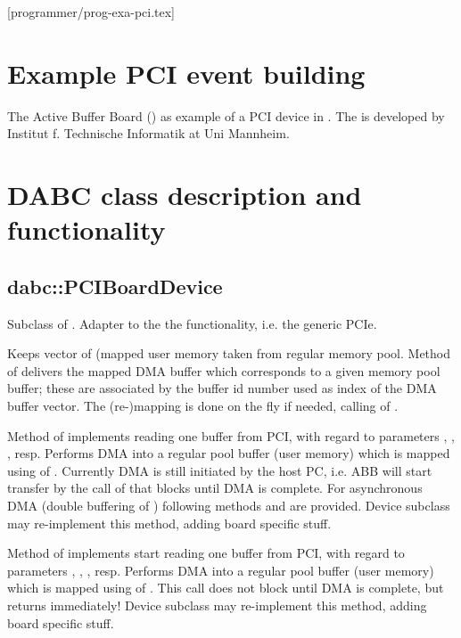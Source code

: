 [programmer/prog-exa-pci.tex]
\section{Example PCI event building}
The Active Buffer Board (\ABB) as example of a PCI device in \dabc.
The \ABB is developed by Institut f. Technische Informatik at Uni Mannheim.

\section{DABC class description and functionality}

\subsection{dabc::PCIBoardDevice}
Subclass of . Adapter to the the  functionality, i.e. the generic PCIe.
\bcir
\item Keeps vector of  (mapped user memory taken from regular \dabc memory pool. Method  of  delivers the mapped DMA buffer which corresponds to a given memory pool buffer; these are associated by the buffer id number used as index of the DMA buffer vector. The (re-)mapping is done on the fly if needed, calling  of .
\item Method  of  implements reading one buffer from PCI, with regard to parameters , , , resp. Performs DMA into a regular pool buffer (user memory) which is mapped using  of . Currently DMA is still initiated by the host PC, i.e. ABB will start transfer by the call of  that blocks until DMA is complete. For asynchronous DMA (double buffering of ) following methods  and  are provided. Device subclass may re-implement this method, adding board specific stuff.
\item Method  of  implements start reading one buffer from PCI, with regard to parameters , , , resp. Performs DMA into a regular pool buffer (user memory) which is mapped using  of . This call does not block until DMA is complete, but returns immediately! Device subclass may re-implement this method, adding board specific stuff.
